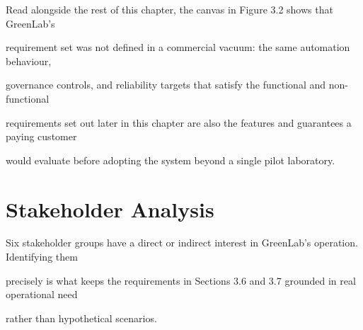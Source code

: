 Read alongside the rest of this chapter, the canvas in Figure 3.2 shows that GreenLab's

requirement set was not defined in a commercial vacuum: the same automation behaviour,

governance controls, and reliability targets that satisfy the functional and non-functional

requirements set out later in this chapter are also the features and guarantees a paying customer

would evaluate before adopting the system beyond a single pilot laboratory.


\section{Stakeholder Analysis}
Six stakeholder groups have a direct or indirect interest in GreenLab's operation. Identifying them

precisely is what keeps the requirements in Sections 3.6 and 3.7 grounded in real operational need

rather than hypothetical scenarios.

